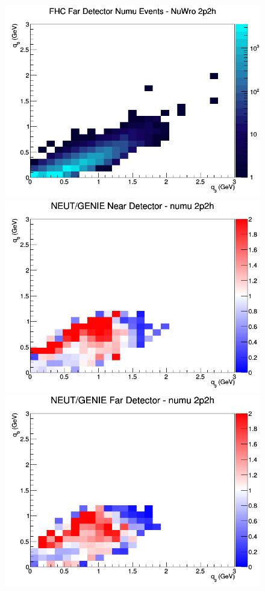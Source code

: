 \documentclass[12pt]{article}
\begin{document}
\begin{figure}[h]
\endminipage
{}
\includegraphics[width=\linewidth]{eff_q0_q3/FGT/2p2h_FHC_FD_numu_q3_q0_NuWro.png}
\endminipage
\newline
{}
\includegraphics[width=\linewidth]{eff_q0_q3/FGT/ratios/2p2h_NEUT_GENIE_numu_near_q3_q0.png}
\endminipage
{}
\includegraphics[width=\linewidth]{eff_q0_q3/FGT/ratios/2p2h_NEUT_GENIE_numu_far_q3_q0.png}

\end{figure}
\end{document}
